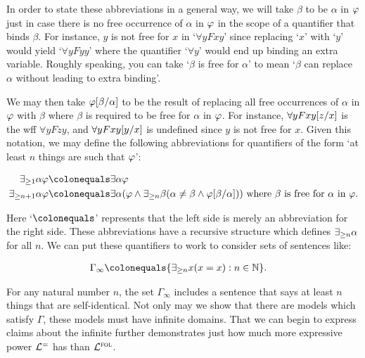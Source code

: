 In order to state these abbreviations in a general way, we will take $\beta$ to be  $\alpha$ in $\varphi$ just in case there is no free occurrence of $\alpha$ in $\varphi$ in the scope of a quantifier that binds $\beta$. 
For instance, $y$ is not free for $x$ in `$\forall y Fxy$' since replacing `$x$' with `$y$' would yield `$\forall yFyy$' where the quantifier `$\forall y$' would end up binding an extra variable.
Roughly speaking, you can take `$\beta$ is free for $\alpha$' to mean `$\beta$ can replace $\alpha$ without leading to extra binding'.

We may then take $\varphi[\beta/\alpha]$ to be the result of replacing all free occurrences of $\alpha$ in $\varphi$ with $\beta$ where $\beta$ is required to be free for $\alpha$ in $\varphi$. 
For instance, $\forall yFxy[z/x]$ is the wff $\forall yFzy$, and $\forall yFxy[y/x]$ is undefined since $y$ is not free for $x$.
Given this notation, we may define the following abbreviations for quantifiers of the form `at least $n$ things are such that $\varphi$':

\vspace{-.2in}
\begin{align*}
  \qt{\exists_{\geq 1}}{\alpha}\metaA &\colonequals \qt{\exists}{\alpha}\metaA\\ 
  \qt{\exists_{\geq n+1}}{\alpha}\metaA &\colonequals \qt{\exists}{\alpha}(\metaA \eand \qt{\exists_{\geq n}}{\beta}(\alpha \neq \beta \eand \metaA\unisub{\beta}{\alpha})) \text{ where } \beta \text{ is free for } \alpha \text{ in } \metaA.
\end{align*}
\vspace{-.2in}

Here `$\colonequals$' represents that the left side is merely an abbreviation for the right side. 
These abbreviations have a recursive structure which defines $\exists_{\geq n} \alpha$ for all $n$.
We can put these quantifiers to work to consider sets of sentences like:

\vspace{-.2in}
\begin{align*}
  \Gamma_{\infty} &\colonequals \set{\qt{\exists_{\geq n}}{x}(x=x): n\in\mathbb{N}}.
\end{align*}
\vspace{-.2in}

For any natural number $n$, the set $\Gamma_\infty$ includes a sentence that says at least $n$ things that are self-identical.
Not only may we show that there are models which satisfy $\Gamma$, these models must have infinite domains.
That we can begin to express claims about the infinite further demonstrates just how much more expressive power $\mathcal{L}^{=}$ has than $\mathcal{L}^{\textsc{fol}}$. 

